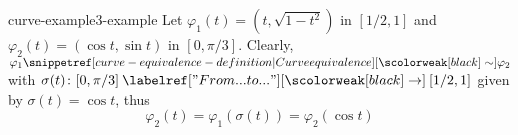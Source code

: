 \documentclass[preview]{standalone}
\begin{document}
\begin{snippetexample}{curve-example3-example}{}
    Let \(\varphi_1(t) = (t, \sqrt{1-t^2})\) in \([1/2, 1]\)
    and \(\varphi_2(t) = (\cos t, \sin t)\) in \([0, \pi/3]\).
    Clearly, \(\varphi_1 \curveequivalent \varphi_2\) with \(\sigma(t) \colon [0, \pi/3] \fromto [1/2, 1]\)
    given by \(\sigma(t) = \cos t\), thus
    \[
        \varphi_2(t) = \varphi_1(\sigma(t))
        = \varphi_2(\cos t)
    \]
\end{snippetexample}
\end{document}
